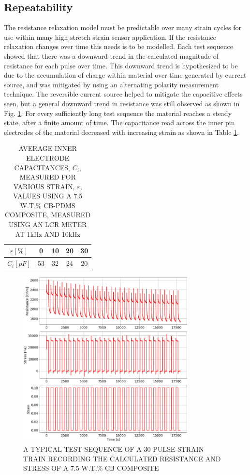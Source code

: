 \subsection*{Repeatability}
The resistance relaxation model must be predictable over many strain cycles for use within many high stretch strain sensor application. If the resistance relaxation changes over time this needs is to be modelled. Each test sequence showed that there was a downward trend in the calculated magnitude of resistance for each pulse over time. This downward trend is hypothesized to be due to the accumulation of charge within material over time generated by current source, and was mitigated by using an alternating polarity measurement technique. The reversible current source helped to mitigate the capacitive effects seen, but a general downward trend in resistance was still observed as shown in Fig. \ref{fig:repeatability_pulse_trains}.  For every sufficiently long test sequence the material reaches a steady state, after a finite amount of time. The capacitance read across the inner pin electrodes of the material decreased with increasing strain as shown in Table \ref{tab:capacitance_v_strain}.
\begin{table}[H]
    \centering
    \caption{AVERAGE INNER ELECTRODE CAPACITANCES, $C_i$, MEASURED FOR VARIOUS STRAIN, $\varepsilon$, VALUES USING A 7.5 W.T.\% CB-PDMS COMPOSITE, MEASURED USING AN LCR METER AT 1kHz AND 10kHz \newline}
    \label{tab:capacitance_v_strain}
    \begin{tabular}{c||cccc}
        $\varepsilon [\%]$ & 0 & 10 & 20 & 30 \\
        \hline
        $C_i [pF]$ & 53 & 32 & 24 & 20 \\
    \end{tabular}
\end{table}
\begin{figure}[h!]
    \centering
    \includegraphics[width=9cm]{Figures/30_pulse_AC_2-7-5_Epin_20mm_v3.png}
    \caption{A TYPICAL TEST SEQUENCE OF A 30 PULSE STRAIN TRAIN RECORDING THE CALCULATED RESISTANCE AND STRESS OF A 7.5 W.T.\% CB COMPOSITE}
    \label{fig:repeatability_pulse_trains}
\end{figure}
